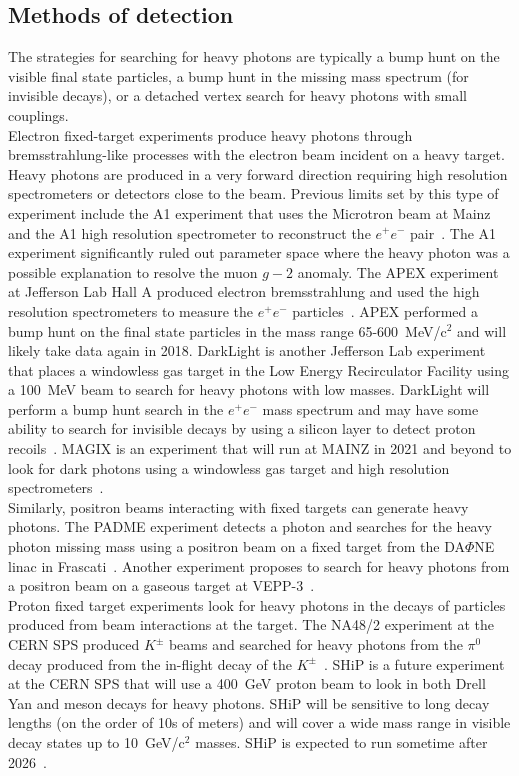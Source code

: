 \subsection{Methods of detection}

The strategies for searching for heavy photons are typically a bump hunt on the visible final state particles, a bump hunt in the missing mass spectrum (for invisible decays), or a detached vertex search for heavy photons with small couplings. \\
\indent Electron fixed-target experiments produce heavy photons through bremsstrahlung-like processes with the electron beam incident on a heavy target. Heavy photons are produced in a very forward direction requiring high resolution spectrometers or detectors close to the beam. Previous limits set by this type of experiment include the A1 experiment that uses the Microtron beam at Mainz and the A1 high resolution spectrometer to reconstruct the $e^+e^-$ pair~\cite{beranek_theoretical_2013}. The A1 experiment significantly ruled out parameter space where the heavy photon was a possible explanation to resolve the muon $g-2$ anomaly. The APEX experiment at Jefferson Lab Hall A produced electron bremsstrahlung and used the high resolution spectrometers to measure the $e^+e^-$ particles~\cite{abrahamyan_search_2011}. APEX performed a bump hunt on the final state particles in the mass range 65-600~MeV/c$^2$ and will likely take data again in 2018. DarkLight is another Jefferson Lab experiment that places a windowless gas target in the Low Energy Recirculator Facility using a 100~MeV beam to search for heavy photons with low masses. DarkLight will perform a bump hunt search in the $e^+e^-$ mass spectrum and may have some ability to search for invisible decays by using a silicon layer to detect proton recoils~\cite{balewski_darklight_2014}. MAGIX is an experiment that will run at MAINZ in 2021 and beyond to look for dark photons using a windowless gas target and high resolution spectrometers~\cite{denig_recent_2016}.\\ 
\indent Similarly, positron beams interacting with fixed targets can generate heavy photons. The PADME experiment detects a photon and searches for the heavy photon missing mass using a positron beam on a fixed target from the DA$\Phi$NE linac in Frascati~\cite{raggi_padme_2015}. Another experiment proposes to search for heavy photons from a positron beam on a gaseous target at VEPP-3~\cite{wojtsekhowski_searching_2012}.\\
\indent Proton fixed target experiments look for heavy photons in the decays of particles produced from beam interactions at the target. The NA48/2 experiment at the CERN SPS produced $K^{\pm}$ beams and searched for heavy photons from the $\pi^0$ decay produced from the in-flight decay of the $K^{\pm}$~\cite{Batley_2015lha}. SHiP is a future experiment at the CERN SPS that will use a 400~GeV proton beam to look in both Drell Yan and meson decays for heavy photons. SHiP will be sensitive to long decay lengths (on the order of 10s of meters) and will cover a wide mass range in visible decay states up to 10~GeV/c$^2$ masses. SHiP is expected to run sometime after 2026~\cite{ship_collaboration_facility_2015}.\\
